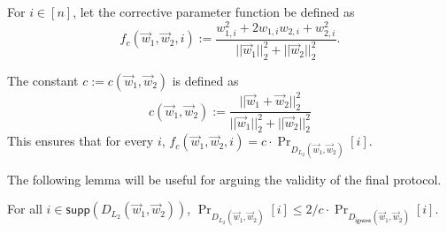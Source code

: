 \begin{definition}
For $i \in [n]$, let the corrective parameter function be defined as 
$$f_c(\vec{w}_1, \vec{w}_2, i) := \frac{w_{1,i}^2 + 2w_{1,i}w_{2,i} +
w_{2,i}^2}{||\vec{w}_1||_2^2 + ||\vec{w}_2||_2^2}.$$
\end{definition}


\begin{definition} 
The constant 
$c := c(\vec{w}_1, \vec{w}_2)$ 
is defined as
\[
c(\vec{w}_1, \vec{w}_2) := \frac{||\vec{w}_1 + \vec{w}_2||_2^2}{||\vec{w}_1||_2^2 + ||\vec{w}_2||_2^2}
\]
This ensures that 
for every $i$,
$f_c(\vec{w}_1, \vec{w}_2, i) = c \cdot \Pr_{D_{L_2}(\vec{w}_1, \vec{w}_2)}[i]$.
\end{definition}

The following lemma will be useful for arguing the validity of the
final protocol.

\begin{lemma} \label{lem:close_dist}
For all $i \in \mathsf{supp}(D_{L_2}(\vec{w}_1, \vec{w}_2))$, 
$\Pr_{D_{L_2}(\vec{w}_1, \vec{w}_2)}[i] \leq 2/c \cdot \Pr_{D_{\mathsf{ignore}}(\vec{w}_1, \vec{w}_2)}[i]$.
\end{lemma}

